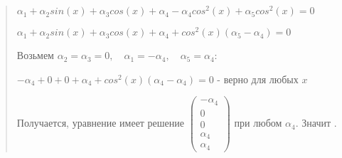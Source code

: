 \documentclass{article}
\begin{document}
\begin{quote}
   $\alpha_1+ \alpha_2 sin(x) + \alpha_3 cos(x) + \alpha_4 - \alpha_4 cos^2(x) + \alpha_5 cos^2(x) = 0$

   $\alpha_1+ \alpha_2 sin(x) + \alpha_3 cos(x) + \alpha_4 + cos^2(x)(\alpha_5 - \alpha_4) = 0$

   Возьмем $\alpha_2 = \alpha_3 = 0, \quad  \alpha_1 = -\alpha_4, \quad \alpha_5 = \alpha_4$:

   $-\alpha_4 + 0 + 0 + \alpha_4 + cos^2(x)(\alpha_4 - \alpha_4) = 0$ - верно для любых $x$

   Получается, уравнение имеет решение $\begin{pmatrix} -\alpha_4 \\ 0 \\ 0 \\ \alpha_4 \\ \alpha_4\end{pmatrix}$ при любом $\alpha_4$. Значит .
\end{quote}
\end{document}
